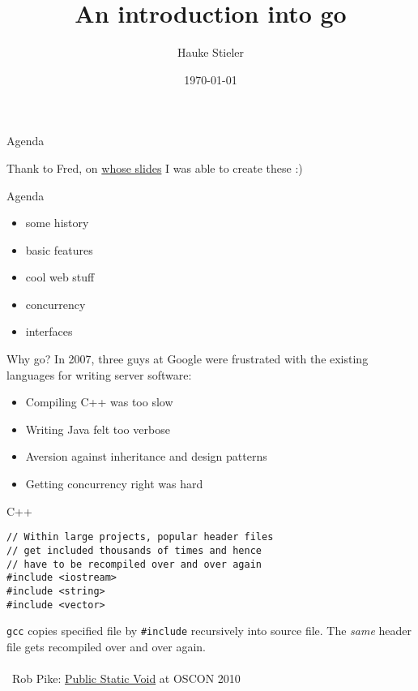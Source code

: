 \documentclass[10pt]{beamer}
\author{Hauke Stieler}
\title{An introduction into go}
\date{\footnotesize \today}
\institute{Universität Hamburg, Department of Informatics}
\begin{document}
	\maketitle
	
	
	\begin{frame}{Agenda}
		\begin{center}
			Thank to Fred, on \href{https://github.com/frectures/go}{whose slides} I was able to create these :)
		\end{center}
	\end{frame}
	
	
	\begin{frame}{Agenda}
		\begin{itemize}
			\item some history
			\item basic features
			\item cool web stuff
			\item concurrency
			\item interfaces
		\end{itemize}
	\end{frame}


	\begin{frame}{Why go?}
		In 2007, three guys at Google were frustrated with the existing languages for writing server software:
		\begin{itemize}
			\item Compiling C++ was too slow
			\item Writing Java felt too verbose
			\item Aversion against inheritance and design patterns
			\item Getting concurrency right was hard
		\end{itemize}
	\end{frame}


	\begin{frame}[t,fragile]{C++}
		\begin{verbatim}
// Within large projects, popular header files
// get included thousands of times and hence
// have to be recompiled over and over again
#include <iostream>
#include <string>
#include <vector>
		\end{verbatim}
		\pause
		\texttt{gcc} copies specified file by \texttt{#include} recursively into source file. The \textit{same} header file gets recompiled over and over again.\\
		\\
		\textrightarrow ~Rob Pike: \href{https://www.youtube.com/watch?v=5kj5ApnhPAE}{Public Static Void} at OSCON 2010
\end{frame}
\end{document}
